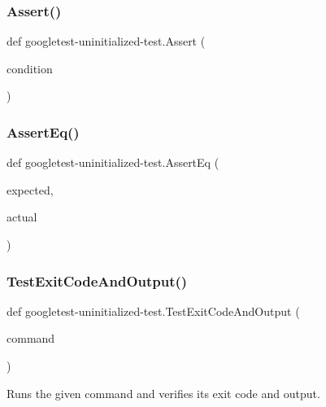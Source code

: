 \subsubsection{\texorpdfstring{Assert()}{Assert()}}
{\footnotesize\ttfamily def googletest-\/uninitialized-\/test.\+Assert (\begin{DoxyParamCaption}\item[{}]{condition }\end{DoxyParamCaption})}

\mbox{\label{namespacegoogletest-uninitialized-test_a8b48f5e81e60f11030082240561c7f94}} 
\subsubsection{\texorpdfstring{AssertEq()}{AssertEq()}}
{\footnotesize\ttfamily def googletest-\/uninitialized-\/test.\+Assert\+Eq (\begin{DoxyParamCaption}\item[{}]{expected,  }\item[{}]{actual }\end{DoxyParamCaption})}

\mbox{\label{namespacegoogletest-uninitialized-test_a70d1a3c3521654597facb5344ee1c968}} 
\subsubsection{\texorpdfstring{TestExitCodeAndOutput()}{TestExitCodeAndOutput()}}
{\footnotesize\ttfamily def googletest-\/uninitialized-\/test.\+Test\+Exit\+Code\+And\+Output (\begin{DoxyParamCaption}\item[{}]{command }\end{DoxyParamCaption})}

\begin{DoxyVerb}Runs the given command and verifies its exit code and output.\end{DoxyVerb}
 

